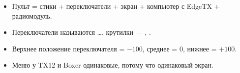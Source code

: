 \begin{summary}
\begin{itemize}
  \item Пульт = стики + переключатели + экран + компьютер с EdgeTX + радиомодуль.
  \item Переключатели называются …, крутилки --- , .
  \item Верхнее положение переключателя = $-100$, среднее = 0, нижнее = $+100$.
  \item Меню у TX12 и Boxer одинаковые, потому что одинаковый экран.
\end{itemize}
\end{summary}
